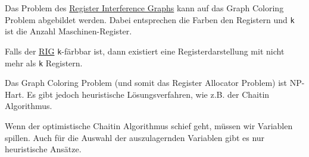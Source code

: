 Das Problem des \hyperref[subsec:rig]{Register Interference Graphs} kann auf das
Graph Coloring Problem abgebildet werden. Dabei entsprechen die Farben den
Registern und \texttt{k} ist die Anzahl Maschinen-Register.

Falls der \hyperref[subsec:rig]{RIG} \texttt{k}-färbbar ist, dann existiert eine
Registerdarstellung mit nicht mehr als \texttt{k} Registern.

Das Graph Coloring Problem (und somit das Register Allocator Problem) ist
NP-Hart. Es gibt jedoch heuristische Lösungsverfahren, wie z.B. der Chaitin
Algorithmus.

Wenn der optimistische Chaitin Algorithmus schief geht, müssen wir Variablen
spillen. Auch für die Auswahl der auszulagernden Variablen gibt es nur
heuristische Ansätze.
